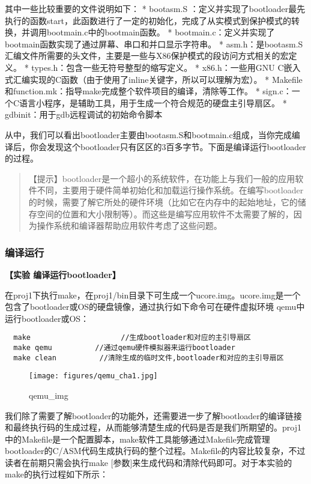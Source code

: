 其中一些比较重要的文件说明如下： * bootasm.S
：定义并实现了bootloader最先执行的函数start，此函数进行了一定的初始化，完成了从实模式到保护模式的转换，并调用bootmain.c中的bootmain函数。
*
bootmain.c：定义并实现了bootmain函数实现了通过屏幕、串口和并口显示字符串。
*
asm.h：是bootasm.S汇编文件所需要的头文件，主要是一些与X86保护模式的段访问方式相关的宏定义。
* types.h：包含一些无符号整型的缩写定义。 * x86.h：一些用GNU
C嵌入式汇编实现的C函数（由于使用了inline关键字，所以可以理解为宏）。 *
Makefile和function.mk：指导make完成整个软件项目的编译，清除等工作。 *
sign.c：一个C语言小程序，是辅助工具，用于生成一个符合规范的硬盘主引导扇区。
* gdbinit：用于gdb远程调试的初始命令脚本

从中，我们可以看出bootloader主要由bootasm.S和bootmain.c组成，当你完成编译后，你会发现这个bootloader只有区区的3百多字节。下面是编译运行bootloader的过程。

\begin{quote}
【提示】bootloader是一个超小的系统软件，在功能上与我们一般的应用软件不同，主要用于硬件简单初始化和加载运行操作系统。在编写bootloader的时候，需要了解它所处的硬件环境（比如它在内存中的起始地址，它的储存空间的位置和大小限制等）。而这些是编写应用软件不太需要了解的，因为操作系统和编译器帮助应用软件考虑了这些问题。
\end{quote}

\subsubsection{编译运行}\label{ux7f16ux8bd1ux8fd0ux884c}

\textbf{【实验 编译运行bootloader】}

在proj1下执行make，在proj1/bin目录下可生成一个ucore.img。ucore.img是一个包含了bootloader或OS的硬盘镜像，通过执行如下命令可在硬件虚拟环境
qemu中运行bootloader或OS：

\begin{lstlisting}
  make                     //生成bootloader和对应的主引导扇区
  make qemu          //通过qemu硬件模拟器来运行bootloader
  make clean          //清除生成的临时文件,bootloader和对应的主引导扇区
\end{lstlisting}

\begin{figure}[htbp]
\centering
\texttt{[image: figures/qemu\_cha1.jpg]}
\caption{qemu\_img}
\end{figure}

我们除了需要了解bootloader的功能外，还需要进一步了解bootloader的编译链接和最终执行码的生成过程，从而能够清楚生成的代码是否是我们所期望的。proj1中的Makefile是一个配置脚本，make软件工具能够通过Makefile完成管理bootloader的C/ASM代码生成执行码的整个过程。Makefile的内容比较复杂，不过读者在前期只需会执行make
{[}参数{]}来生成代码和清除代码即可。对于本实验的make的执行过程如下所示：

